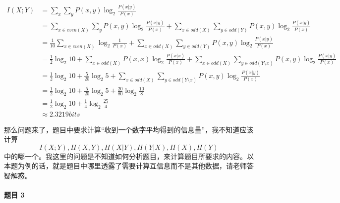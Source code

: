 \documentclass{ctexart}
\begin{document}
\begin{align}
    I(X; Y) &= \sum_x\sum_y P(x, y)\log_2\frac{P(x|y)}{P(x)} \\
    &= \sum_{x \in even(X)}\sum_y P(x, y)\log_2\frac{P(x|y)}{P(x)} + \sum_{x \in odd(X)}\sum_{y \in odd(Y)} P(x, y)\log_2\frac{P(x|y)}{P(x)} \\
    &= \frac{1}{10}\sum_{x \in even(X)} \log_2\frac{1}{P(x)} + \sum_{x \in odd(X)}\sum_{y \in odd(Y)} P(x, y)\log_2\frac{P(x|y)}{P(x)} \\
    &= \frac{1}{2}\log_2 10 + \sum_{x \in odd(X)} P(x, x)\log_2\frac{P(x|x)}{P(x)} + \sum_{x \in odd(X)}\sum_{y \in odd(Y \setminus x)} P(x, y)\log_2\frac{P(x|y)}{P(x)} \\
    &= \frac{1}{2}\log_2 10 + \frac{5}{20}\log_2 5 + \sum_{x \in odd(X)}\sum_{y \in odd(Y \setminus x)} P(x, y)\log_2\frac{P(x|y)}{P(x)} \\
    &= \frac{1}{2}\log_2 10 + \frac{5}{20}\log_2 5 + \frac{20}{80}\log_2 \frac{10}{8} \\
    &= \frac{1}{2}\log_2 10 + \frac{1}{4}\log_2 \frac{25}{4} \\
    &\approx 2.3219 bits
\end{align}

那么问题来了，题目中要求计算“收到一个数字平均得到的信息量”，我不知道应该计算
$$I(X; Y), H(X, Y), H(X|Y), H(Y|X), H(X), H(Y)$$
中的哪一个。我这里的问题是不知道如何分析题目，来计算题目所要求的内容。以本题为例的话，就是题目中哪里透露了需要计算互信息而不是其他数据，请老师答疑解惑。

\paragraph{题目 3}
\end{document}
